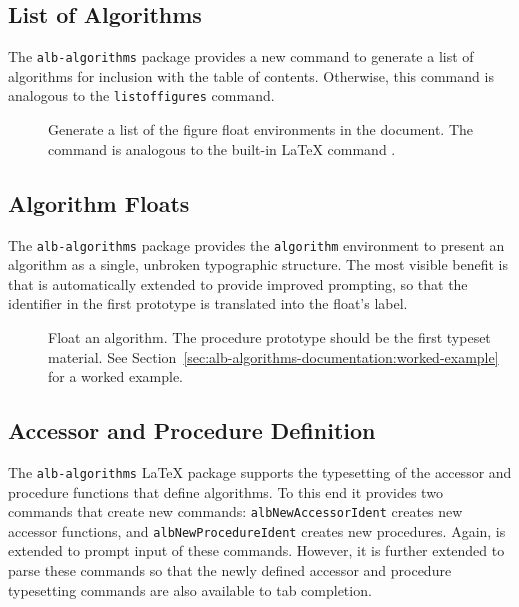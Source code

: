 \documentclass[11pt,a4paper,oneside,titlepage]{alb-latex}
\begin{document}
\subsection{List of Algorithms}
\label{sec:alb-algorithms-documentation:list-algor}

The \texttt{alb-algorithms} package provides a new command to generate a
list of algorithms for inclusion with the table of contents.  Otherwise,
this command is analogous to the \texttt{listoffigures} command.

\begin{description}
\item[] Generate a list of the figure float
  environments in the document.  The command is analogous to the
  built-in LaTeX command .
\end{description}



\subsection{Algorithm Floats}
\label{sec:alb-algorithms-documentation:algor-floats}

The \texttt{alb-algorithms} package provides the \texttt{algorithm}
environment to present an algorithm as a single, unbroken typographic
structure.  The most visible benefit is that \AUCTeX{} is automatically
extended to provide improved prompting, so that the identifier in the
first prototype is translated into the float's label.

\begin{description}
\item[] Float an algorithm.  The procedure
  prototype should be the first typeset material.  See
  Section~\ref{sec:alb-algorithms-documentation:worked-example} for a
  worked example.
\end{description}



\subsection{Accessor and Procedure Definition}
\label{sec:alb-algorithms-documentation:accessor-proc-defin}

The \texttt{alb-algorithms} \LaTeX{} package supports the typesetting of
the accessor and procedure functions that define algorithms.  To this
end it provides two commands that create new commands:
\texttt{albNewAccessorIdent} creates new accessor functions, and
\texttt{albNewProcedureIdent} creates new procedures.  Again, \AUCTeX{}
is extended to prompt input of these commands.  However, it is further
extended to parse these commands so that the newly defined accessor and
procedure typesetting commands are also available to tab completion.
\end{document}
